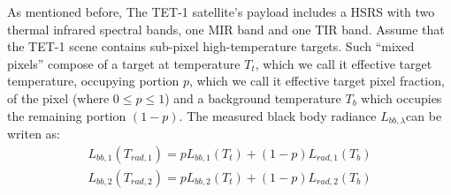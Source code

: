As mentioned before, The TET-1 satellite's payload includes a HSRS with two thermal infrared spectral bands, one MIR band and one TIR band. Assume that the TET-1 scene contains sub-pixel high-temperature targets. Such “mixed pixels'' compose of a target at temperature $T_t$, which we call it effective target temperature, occupying portion $p$, which we call it effective target pixel fraction, of the pixel (where $0 \leqslant p \leqslant 1$) and a background temperature $T_b$ which occupies the remaining portion $(1 - p)$. The measured black body radiance $L_{bb, \lambda}$can be writen as:\\
\begin{equation}
\begin{aligned}
\label{eq5}
L_{bb, 1}(T_{rad, 1}) = pL_{bb, 1}(T_t) + (1 - p)L_{rad, 1}(T_b)\\
L_{bb, 2}(T_{rad, 2}) = pL_{bb, 2}(T_t) + (1 - p)L_{rad, 2}(T_b)
\end{aligned}
\end{equation}


